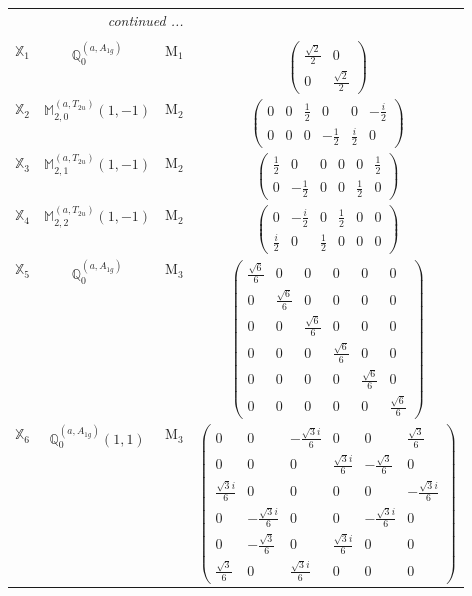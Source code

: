 \documentclass[fleqn,10pt,landscape]{article}
\begin{document}
\begin{itemize}
\begin{center}
\begin{longtable}{c|c|c|c}
 \hline \hline
\multicolumn{3}{r}{\footnotesize\it continued ...} \\ \endfoot

 \hline \hline
\multicolumn{3}{r}{} \\ \endlastfoot

$ \mathbb{X}_{1} $ & $\mathbb{Q}_{0}^{(a,A_{1g})}$ & M$_{1}$ & $\begin{pmatrix} \frac{\sqrt{2}}{2} & 0 \\ 0 & \frac{\sqrt{2}}{2} \end{pmatrix}$ \\ \hline
$ \mathbb{X}_{2} $ & $\mathbb{M}_{2,0}^{(a,T_{2u})}(1,-1)$ & M$_{2}$ & $\begin{pmatrix} 0 & 0 & \frac{1}{2} & 0 & 0 & - \frac{i}{2} \\ 0 & 0 & 0 & - \frac{1}{2} & \frac{i}{2} & 0 \end{pmatrix}$ \\
$ \mathbb{X}_{3} $ & $\mathbb{M}_{2,1}^{(a,T_{2u})}(1,-1)$ & M$_{2}$ & $\begin{pmatrix} \frac{1}{2} & 0 & 0 & 0 & 0 & \frac{1}{2} \\ 0 & - \frac{1}{2} & 0 & 0 & \frac{1}{2} & 0 \end{pmatrix}$ \\
$ \mathbb{X}_{4} $ & $\mathbb{M}_{2,2}^{(a,T_{2u})}(1,-1)$ & M$_{2}$ & $\begin{pmatrix} 0 & - \frac{i}{2} & 0 & \frac{1}{2} & 0 & 0 \\ \frac{i}{2} & 0 & \frac{1}{2} & 0 & 0 & 0 \end{pmatrix}$ \\ \hline
$ \mathbb{X}_{5} $ & $\mathbb{Q}_{0}^{(a,A_{1g})}$ & M$_{3}$ & $\begin{pmatrix} \frac{\sqrt{6}}{6} & 0 & 0 & 0 & 0 & 0 \\ 0 & \frac{\sqrt{6}}{6} & 0 & 0 & 0 & 0 \\ 0 & 0 & \frac{\sqrt{6}}{6} & 0 & 0 & 0 \\ 0 & 0 & 0 & \frac{\sqrt{6}}{6} & 0 & 0 \\ 0 & 0 & 0 & 0 & \frac{\sqrt{6}}{6} & 0 \\ 0 & 0 & 0 & 0 & 0 & \frac{\sqrt{6}}{6} \end{pmatrix}$ \\
$ \mathbb{X}_{6} $ & $\mathbb{Q}_{0}^{(a,A_{1g})}(1,1)$ & M$_{3}$ & $\begin{pmatrix} 0 & 0 & - \frac{\sqrt{3} i}{6} & 0 & 0 & \frac{\sqrt{3}}{6} \\ 0 & 0 & 0 & \frac{\sqrt{3} i}{6} & - \frac{\sqrt{3}}{6} & 0 \\ \frac{\sqrt{3} i}{6} & 0 & 0 & 0 & 0 & - \frac{\sqrt{3} i}{6} \\ 0 & - \frac{\sqrt{3} i}{6} & 0 & 0 & - \frac{\sqrt{3} i}{6} & 0 \\ 0 & - \frac{\sqrt{3}}{6} & 0 & \frac{\sqrt{3} i}{6} & 0 & 0 \\ \frac{\sqrt{3}}{6} & 0 & \frac{\sqrt{3} i}{6} & 0 & 0 & 0 \end{pmatrix}$ \\

\end{longtable}
\end{center}
\end{itemize}
\end{document}
